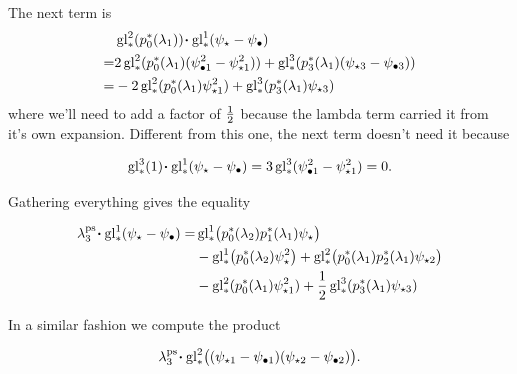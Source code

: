\documentclass[12pt]{memoir}
\begin{document}
\begin{ptcb}
    The next term is
    \begin{align*}
          & \glu_\ast^2(p_0^\ast(\la_1))\.\glu_\ast^1(\psi_\star-\psi_\8)                                                      \\
        = & 2\glu^2_\ast(p_0^\ast(\la_1)(\psi_{\81}^2-\psi_{\star1}^2))+\glu^3_\ast(p_3^\ast(\la_1)(\psi_{\star3}-\psi_{\83})) \\
        = & -2\glu^2_\ast(p_0^\ast(\la_1)\psi_{\star1}^2)+\glu^3_\ast(p_3^\ast(\la_1)\psi_{\star3})
    \end{align*}
    where we'll need to add a factor of \(\half\) because the lambda term carried it from it's own expansion. Different from this one, the next term doesn't need it because

    \[\glu_\ast^3(1)\.\glu_\ast^1(\psi_\star-\psi_\8)=3\glu_\ast^3(\psi_{\81}^2-\psi_{\star1}^2)=0.\]

\end{ptcb}

Gathering everything gives the equality

\begin{align*}
    \la_3^{\ps}\.\glu_\ast^1(\psi_\star-\psi_\8)= & \glu_\ast^1\bigl(p_0^\ast(\la_2)p_1^\ast(\la_1)\psi_\star\bigr)                                                        \\
                                                  & -\glu_\ast^1\bigl(p_0^\ast(\la_2)\psi_\star^2\bigr)+\glu_\ast^2\bigl(p_0^\ast(\la_1)p_2^\ast(\la_1)\psi_{\star2}\bigr) \\
                                                  & -\glu^2_\ast(p_0^\ast(\la_1)\psi_{\star1}^2)+\half\glu^3_\ast(p_3^\ast(\la_1)\psi_{\star3})
\end{align*}

In a similar fashion we compute the product


\[\la_3^{\ps}\.\glu_\ast^2\bigl((\psi_{\star1}-\psi_{\81})(\psi_{\star2}-\psi_{\82})\bigr).\]
\end{document}
